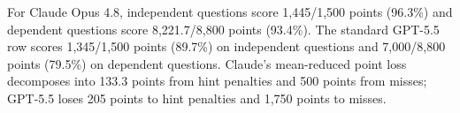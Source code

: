 \documentclass{jmlr}%
\begin{document}
For Claude Opus 4.8, independent questions score 1,445/1,500 points (96.3\%) and dependent questions score 8,221.7/8,800 points (93.4\%).
The standard GPT-5.5 row scores 1,345/1,500 points (89.7\%) on independent questions and 7,000/8,800 points (79.5\%) on dependent questions.
Claude's mean-reduced point loss decomposes into 133.3 points from hint penalties and 500 points from misses; GPT-5.5 loses 205 points to hint penalties and 1,750 points to misses.
\end{document}
